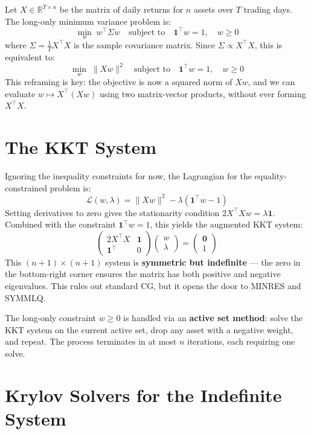 \documentclass[11pt, a4paper]{article}
\begin{document}
Let $X \in \mathbb{R}^{T \times n}$ be the matrix of daily returns for $n$ assets over $T$ trading days. The long-only minimum variance problem is:
\[
\min_{w} \; w^\top \Sigma w \quad \text{subject to} \quad \mathbf{1}^\top w = 1, \quad w \geq 0
\]
where $\Sigma = \frac{1}{T} X^\top X$ is the sample covariance matrix. Since $\Sigma \propto X^\top X$, this is equivalent to:
\[
\min_{w} \; \|Xw\|^2 \quad \text{subject to} \quad \mathbf{1}^\top w = 1, \quad w \geq 0
\]
This reframing is key: the objective is now a squared norm of $Xw$, and we can evaluate $w \mapsto X^\top(Xw)$ using two matrix-vector products, without ever forming $X^\top X$.

\section{The KKT System}

Ignoring the inequality constraints for now, the Lagrangian for the equality-constrained problem is:
\[
\mathcal{L}(w, \lambda) = \|Xw\|^2 - \lambda(\mathbf{1}^\top w - 1)
\]
Setting derivatives to zero gives the stationarity condition $2X^\top X w = \lambda \mathbf{1}$. Combined with the constraint $\mathbf{1}^\top w = 1$, this yields the augmented KKT system:
\[
\begin{pmatrix} 2X^\top X & \mathbf{1} \\ \mathbf{1}^\top & 0 \end{pmatrix}
\begin{pmatrix} w \\ \lambda \end{pmatrix}
=
\begin{pmatrix} \mathbf{0} \\ 1 \end{pmatrix}
\]
This $(n+1) \times (n+1)$ system is \textbf{symmetric but indefinite} — the zero in the bottom-right corner ensures the matrix has both positive and negative eigenvalues. This rules out standard CG, but it opens the door to MINRES and SYMMLQ.

The long-only constraint $w \geq 0$ is handled via an \textbf{active set method}: solve the KKT system on the current active set, drop any asset with a negative weight, and repeat. The process terminates in at most $n$ iterations, each requiring one solve.

\section{Krylov Solvers for the Indefinite System}
\end{document}
